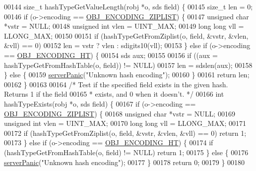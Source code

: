 \begin{DoxyCode}
00144 size\_t hashTypeGetValueLength(robj *o, sds field) \{
00145     size\_t len = 0;
00146     \textcolor{keywordflow}{if} (o->encoding == \hyperlink{server_8h_aabf064ede983103f1fd0df2086e84eee}{OBJ\_ENCODING\_ZIPLIST}) \{
00147         \textcolor{keywordtype}{unsigned} \textcolor{keywordtype}{char} *vstr = NULL;
00148         \textcolor{keywordtype}{unsigned} \textcolor{keywordtype}{int} vlen = UINT\_MAX;
00149         \textcolor{keywordtype}{long} \textcolor{keywordtype}{long} vll = LLONG\_MAX;
00150 
00151         \textcolor{keywordflow}{if} (hashTypeGetFromZiplist(o, field, &vstr, &vlen, &vll) == 0)
00152             len = vstr ? vlen : sdigits10(vll);
00153     \} \textcolor{keywordflow}{else} \textcolor{keywordflow}{if} (o->encoding == \hyperlink{server_8h_a9c10219f68afc557d510d108257d238b}{OBJ\_ENCODING\_HT}) \{
00154         sds aux;
00155 
00156         \textcolor{keywordflow}{if} ((aux = hashTypeGetFromHashTable(o, field)) != NULL)
00157             len = sdslen(aux);
00158     \} \textcolor{keywordflow}{else} \{
00159         \hyperlink{server_8h_a11cc378e7778a830b41240578de3b204}{serverPanic}(\textcolor{stringliteral}{"Unknown hash encoding"});
00160     \}
00161     \textcolor{keywordflow}{return} len;
00162 \}
00163 
00164 \textcolor{comment}{/* Test if the specified field exists in the given hash. Returns 1 if the field}
00165 \textcolor{comment}{ * exists, and 0 when it doesn't. */}
00166 \textcolor{keywordtype}{int} hashTypeExists(robj *o, sds field) \{
00167     \textcolor{keywordflow}{if} (o->encoding == \hyperlink{server_8h_aabf064ede983103f1fd0df2086e84eee}{OBJ\_ENCODING\_ZIPLIST}) \{
00168         \textcolor{keywordtype}{unsigned} \textcolor{keywordtype}{char} *vstr = NULL;
00169         \textcolor{keywordtype}{unsigned} \textcolor{keywordtype}{int} vlen = UINT\_MAX;
00170         \textcolor{keywordtype}{long} \textcolor{keywordtype}{long} vll = LLONG\_MAX;
00171 
00172         \textcolor{keywordflow}{if} (hashTypeGetFromZiplist(o, field, &vstr, &vlen, &vll) == 0) \textcolor{keywordflow}{return} 1;
00173     \} \textcolor{keywordflow}{else} \textcolor{keywordflow}{if} (o->encoding == \hyperlink{server_8h_a9c10219f68afc557d510d108257d238b}{OBJ\_ENCODING\_HT}) \{
00174         \textcolor{keywordflow}{if} (hashTypeGetFromHashTable(o, field) != NULL) \textcolor{keywordflow}{return} 1;
00175     \} \textcolor{keywordflow}{else} \{
00176         \hyperlink{server_8h_a11cc378e7778a830b41240578de3b204}{serverPanic}(\textcolor{stringliteral}{"Unknown hash encoding"});
00177     \}
00178     \textcolor{keywordflow}{return} 0;
00179 \}
00180 

\end{DoxyCode}
